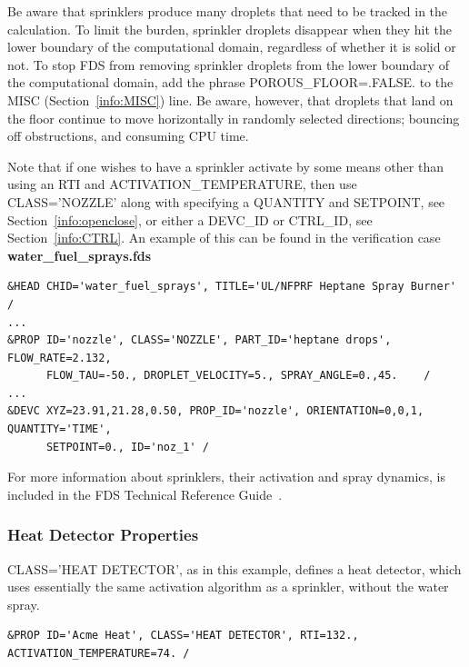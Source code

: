 \documentclass[11pt]{book}
\begin{document}
\noindent
Be aware that sprinklers produce many droplets that need to be
tracked in the calculation. To limit the burden, sprinkler droplets disappear when they hit the
lower boundary of the computational domain, regardless of whether it is solid
or not. To stop FDS from removing sprinkler droplets from the lower boundary of the computational domain,
add the phrase {\ct POROUS\_FLOOR=.FALSE.} to the {\ct MISC} (Section~\ref{info:MISC}) line. Be aware, however, that
droplets that land on the floor continue to move horizontally in randomly selected
directions; bouncing off obstructions, and consuming CPU time.

\begin{warning}
\noindent
Note that if one wishes to have a sprinkler activate by some means other than using an {\ct RTI} and {\ct
ACTIVATION\_TEMPERATURE}, then use {\ct CLASS='NOZZLE'} along with specifying a {\ct QUANTITY} and {\ct SETPOINT},
see Section~\ref{info:openclose}, or either a {\ct DEVC\_ID} or {\ct CTRL\_ID}, see Section~\ref{info:CTRL}.
An example of this can be found in the verification case {\bf water\_fuel\_sprays.fds}
\end{warning}
\footnotesize
\begin{verbatim}
&HEAD CHID='water_fuel_sprays', TITLE='UL/NFPRF Heptane Spray Burner' /
...
&PROP ID='nozzle', CLASS='NOZZLE', PART_ID='heptane drops', FLOW_RATE=2.132,
      FLOW_TAU=-50., DROPLET_VELOCITY=5., SPRAY_ANGLE=0.,45.    /
...
&DEVC XYZ=23.91,21.28,0.50, PROP_ID='nozzle', ORIENTATION=0,0,1, QUANTITY='TIME',
      SETPOINT=0., ID='noz_1' /
\end{verbatim}
\normalsize

For more information about sprinklers, their activation and spray dynamics, is included in the FDS
Technical Reference Guide~\cite{FDS_Tech_Guide_5}.



\subsubsection{Heat Detector Properties}

{\ct CLASS='HEAT DETECTOR'}, as in this example, defines a heat detector, which uses essentially the same activation algorithm as a sprinkler, without the water spray.

\footnotesize
\begin{verbatim}
&PROP ID='Acme Heat', CLASS='HEAT DETECTOR', RTI=132., ACTIVATION_TEMPERATURE=74. /
\end{verbatim}
\end{document}
